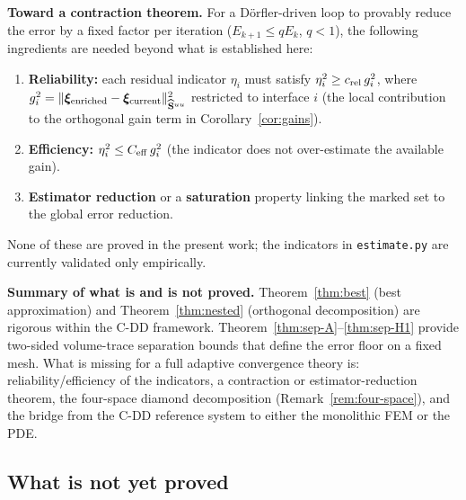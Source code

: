 \documentclass[11pt,a4paper]{article}
\theoremstyle{definition}
\newcommand{\Schur}{\mathbf{S}}
\newcommand{\Shatuu}{\widehat{\Schur}{}^{uu}}
\begin{document}
\textbf{Toward a contraction theorem.}
For a D\"orfler-driven loop to provably reduce the error by a fixed
factor per iteration ($E_{k+1}\le q E_k$, $q<1$), the following
ingredients are needed beyond what is established here:
\begin{enumerate}[nosep,leftmargin=*]
  \item \textbf{Reliability:} each residual indicator $\eta_i$ must
    satisfy $\eta_i^2 \ge c_{\rm rel}\,g_i^2$, where $g_i^2 =
    \|\bm{\xi}_{\rm enriched}-\bm{\xi}_{\rm current}\|_{\Shatuu}^2$
    restricted to interface $i$ (the local contribution to the
    orthogonal gain term in Corollary~\ref{cor:gains}).
  \item \textbf{Efficiency:} $\eta_i^2 \le C_{\rm eff}\,g_i^2$ (the
    indicator does not over-estimate the available gain).
  \item \textbf{Estimator reduction} or a \textbf{saturation} property
    linking the marked set to the global error reduction.
\end{enumerate}
None of these are proved in the present work; the indicators in
\texttt{estimate.py} are currently validated only empirically.

\textbf{Summary of what is and is not proved.}
Theorem~\ref{thm:best} (best approximation) and
Theorem~\ref{thm:nested} (orthogonal decomposition) are rigorous
within the C-DD framework.  Theorem~\ref{thm:sep-A}--\ref{thm:sep-H1}
provide two-sided volume-trace separation bounds that define the error
floor on a fixed mesh.  What is missing for a full adaptive convergence
theory is: reliability/efficiency of the indicators, a contraction or
estimator-reduction theorem, the four-space diamond decomposition
(Remark~\ref{rem:four-space}), and the bridge from the C-DD reference
system to either the monolithic FEM or the PDE.

\subsection{What is not yet proved}
\end{document}
